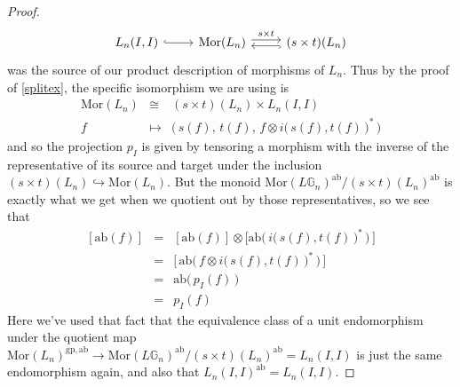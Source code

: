 \documentclass{amsbook} %
\newcommand{\MorLn}{\mathrm{Mor}(L_n)}
\numberwithin{section}{chapter}
\begin{document}
\begin{proof}
\[ \begin{tikzcd}
L_n(I,I) \ar[r, hookrightarrow] & \MorLn \ar[r, shift left, "s \times t"] & (s \times t)(L_n) \ar[l, shift left, hookrightarrow, ""]
\end{tikzcd} \]
was the source of our product description of morphisms of $L_n$. Thus by the proof of \cref{splitex}, the specific isomorphism we are using is
\[ \begin{array}{rll}
			\MorLn & \cong & (s \times t)(L_n) \times L_n(I,I) \\
			f & \mapsto & \Big( \, s(f), \, t(f), \, f \otimes i\big( \, s(f), t(f) \, \big)^* \, \Big)
		\end{array}
\]
and so the projection $p_I$ is given by tensoring a morphism with the inverse of the representative of its source and target under the inclusion $(s \times t)(L_n) \hookrightarrow \MorLn$. But the monoid $\mathrm{Mor}(L\mathbb{G}_{n})^{\mathrm{ab}}/(s \times t)(L_n)^{\mathrm{ab}}$ is exactly what we get when we quotient out by those representatives, so we see that
\[ \begin{array}{rll}
			[\mathrm{ab}(f)] & = &  [\mathrm{ab}(f)] \otimes \Big[ \mathrm{ab}\Big( \, i\big( \, s(f), t(f) \, \big)^* \, \Big) \, \Big] \\
			& = & \Big[ \, \mathrm{ab}\Big( \, f \otimes i\big( \, s(f), t(f) \, \big)^* \, \Big) \, \Big] \\
			& = & \mathrm{ab}\big( \, p_I(f) \, \big) \\
			& = & p_I(f)
		\end{array}
\]
Here we've used that fact that the equivalence class of a unit endomorphism under the quotient map $\MorLn^{\mathrm{gp},\mathrm{ab}} \to \mathrm{Mor}(L\mathbb{G}_{n})^{\mathrm{ab}}/(s \times t)(L_n)^{\mathrm{ab}} = L_n(I,I)$ is just the same endomorphism again, and also that $L_n(I,I)^{\mathrm{ab}} = L_n(I,I)$. 


\end{proof}
\end{document}

